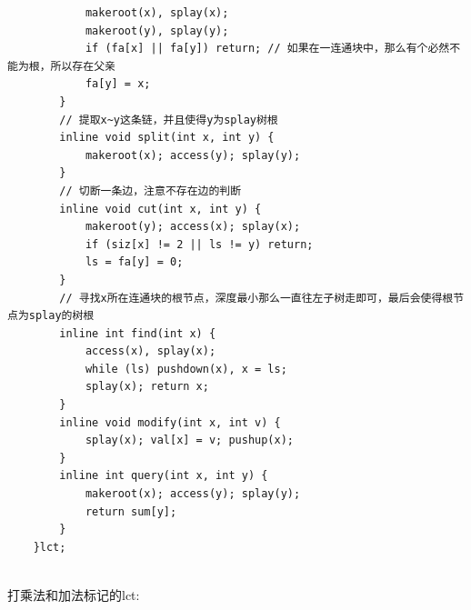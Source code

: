 \documentclass[a4paper,11pt,twoside,fontset = fandol,UTF8]{ctexbook} %
\begin{document}
\begin{lstlisting}
	        makeroot(x), splay(x);
	        makeroot(y), splay(y);
	        if (fa[x] || fa[y]) return; // 如果在一连通块中，那么有个必然不能为根，所以存在父亲
	        fa[y] = x;
	    }
	    // 提取x~y这条链，并且使得y为splay树根
	    inline void split(int x, int y) {
	        makeroot(x); access(y); splay(y);
	    }
	    // 切断一条边，注意不存在边的判断
	    inline void cut(int x, int y) {
	        makeroot(y); access(x); splay(x);
	        if (siz[x] != 2 || ls != y) return;
	        ls = fa[y] = 0;
	    }
	    // 寻找x所在连通块的根节点，深度最小那么一直往左子树走即可，最后会使得根节点为splay的树根
	    inline int find(int x) {
	        access(x), splay(x);
	        while (ls) pushdown(x), x = ls;
	        splay(x); return x;
	    }
	    inline void modify(int x, int v) {
	        splay(x); val[x] = v; pushup(x);
	    }
	    inline int query(int x, int y) {
	        makeroot(x); access(y); splay(y);
	        return sum[y];
	    }
	}lct;
	
	\end{lstlisting}
	
	打乘法和加法标记的lct:
	
\end{document}
